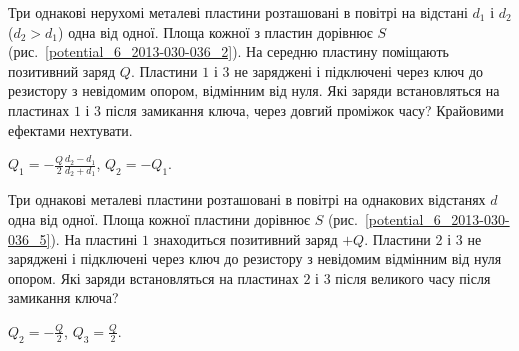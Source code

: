 \begin{problem}\label{prb:potential_6_2013-030-036_2}
    Три однакові нерухомі металеві пластини розташовані в повітрі на відстані $d_1$ і $d_2$ ($d_2> d_1$) одна від одної. Площа кожної з пластин дорівнює $S$ (рис.~\ref{potential_6_2013-030-036_2}). На середню пластину поміщають позитивний заряд $Q$. Пластини $1$ і $3$ не заряджені і підключені через ключ до резистору з невідомим опором, відмінним від нуля. Які заряди встановляться на пластинах $1$ і $3$ після замикання ключа, через довгий проміжок часу? Крайовими ефектами нехтувати.
\begin{solution}
	$Q_1 = -\frac{Q}{2}\frac{d_2 - d_1}{d_2 + d_1}$, $Q_2 = - Q_1$.
\end{solution}
\end{problem}

\begin{problem}\label{prb:potential_6_2013-030-036_5}
    Три однакові металеві пластини розташовані в повітрі на однакових відстанях $d$ одна від одної. Площа кожної пластини дорівнює $S$ (рис.~\ref{potential_6_2013-030-036_5}). На пластині $1$ знаходиться позитивний заряд $+Q$. Пластини $2$ і $3$ не заряджені і підключені через ключ до резистору з невідомим відмінним від нуля опором. Які заряди встановляться на пластинах $2$ і $3$ після великого часу після замикання ключа?
\begin{solution}
	$Q_2 = -\frac{Q}{2}$, $Q_3 = \frac{Q}{2}$.
\end{solution}
\end{problem}

